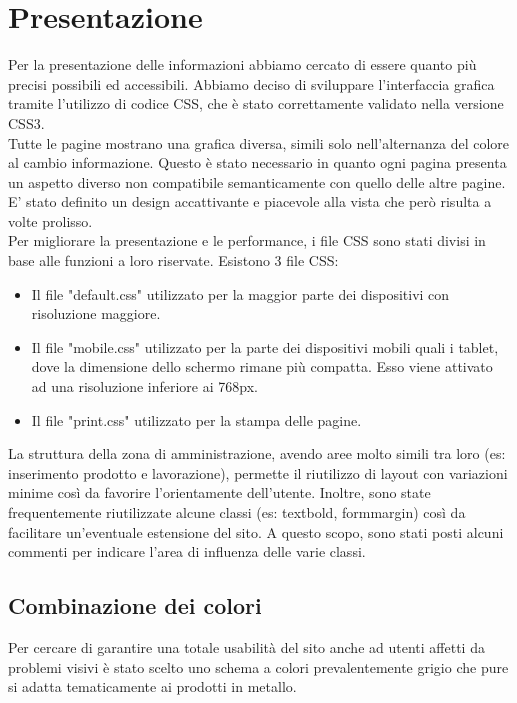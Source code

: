 \documentclass[11pt]{article}
\begin{document}
\section{Presentazione}

Per la presentazione delle informazioni abbiamo cercato di essere quanto più precisi possibili ed accessibili. Abbiamo deciso di sviluppare l'interfaccia grafica tramite l'utilizzo di codice CSS, che è stato correttamente validato nella versione CSS3.
\\
Tutte le pagine mostrano una grafica diversa, simili solo nell'alternanza del colore al cambio informazione. Questo è stato necessario in quanto ogni pagina presenta un aspetto diverso non compatibile semanticamente con quello delle altre pagine.
\\ E' stato definito un design accattivante e piacevole alla vista che però risulta a volte prolisso. 
\\
Per migliorare la presentazione e le performance, i file CSS sono stati divisi in base alle funzioni a loro riservate. Esistono 3 file CSS:
\begin{itemize}
	\item Il file "default.css" utilizzato per la maggior parte dei dispositivi con risoluzione maggiore.
	\item Il file "mobile.css" utilizzato per la parte dei dispositivi mobili quali i tablet, dove la dimensione dello schermo rimane più compatta. Esso viene attivato ad una risoluzione inferiore ai 768px.
	\item Il file "print.css" utilizzato per la stampa delle pagine.
\end{itemize}

La struttura della zona di amministrazione, avendo aree molto simili tra loro (es: inserimento prodotto e lavorazione), permette il riutilizzo di layout con variazioni minime così da favorire l'orientamente dell'utente. Inoltre, sono state frequentemente riutilizzate alcune classi (es: textbold, formmargin) così da facilitare un'eventuale estensione del sito. 
A questo scopo, sono stati posti alcuni commenti per indicare l'area di influenza delle varie classi.

\subsection{Combinazione dei colori}

Per cercare di garantire una totale usabilità del sito anche ad utenti affetti da problemi visivi è stato scelto uno schema a colori prevalentemente grigio che pure si adatta tematicamente ai prodotti in metallo.
\end{document}
